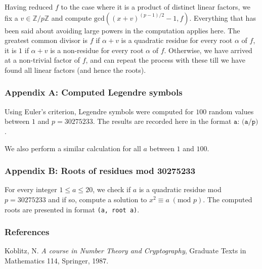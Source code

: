 \documentclass[12pt]{article}
\newcommand{\textmod}[1]{\;(\text{mod }#1)}
\begin{document}
Having reduced \(f\) to the case where it is a product of distinct linear
factors, we fix a \(v \in \mathbb{Z}/p\mathbb{Z}\) and compute
\(\text{gcd}((x+v)^{(p-1)/2}-1, f)\). Everything that has been said about
avoiding large powers in the computation applies here. The greatest common
divisor is \(f\) if \(\alpha+v\) is a quadratic residue for every root
\(\alpha\) of \(f\), it is \(1\) if \(\alpha+v\) is a non-residue for every root
\(\alpha\) of \(f\). Otherwise, we have arrived at a non-trivial factor
of \(f\), and can repeat the process with these till we have found all
linear factors (and hence the roots).

\subsubsection*{Appendix A: Computed Legendre symbols}
Using Euler's criterion, Legendre symbols were computed for \(100\) random
values between \(1\) and \(p=30275233\). The results are recorded here in the
format \(\texttt{a: (a/p)}\).

 

We also perform a similar calculation for all \(a\) between \(1\) and \(100\).

 

\subsubsection*{Appendix B: Roots of residues mod 30275233}
For every integer \(1\leq a\leq 20\), we check if \(a\) is a quadratic residue
mod \(p=30275233\) and if so, compute a solution to \(x^2\equiv a\textmod{p}\).
The computed roots are presented in format \texttt{(a, root a)}.

 

\subsubsection*{References}
\begin{enumerate}[{[}1{]}]
    \item Koblitz, N. \textit{A course in Number Theory and Cryptography},
        Graduate Texts in Mathematics 114, Springer, 1987.
\end{enumerate}
\end{document}
